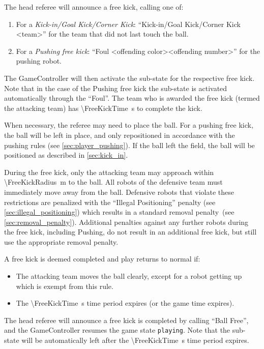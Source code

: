 The head referee will announce a free kick, calling one of:
\begin{enumerate}
  \item For a \textit{Kick-in/Goal Kick/Corner Kick}: ``Kick-in/Goal Kick/Corner Kick \textless team\textgreater'' for the team that did not last touch the ball.
  \item For a \textit{Pushing free kick}: ``Foul \textless offending color\textgreater \textless offending number\textgreater'' for the pushing robot.
\end{enumerate}

The GameController will then activate the sub-state for the respective free kick.
Note that in the case of the Pushing free kick the sub-state is activated automatically through the ``Foul''.
The team who is awarded the free kick (termed the attacking team) has \qty{\FreeKickTime}{\second} to complete the kick.

When necessary, the referee may need to place the ball.
For a pushing free kick, the ball will be left in place, and only repositioned in accordance with the pushing rules (see \cref{sec:player_pushing}).
If the ball left the field, the ball will be positioned as described in \cref{sec:kick_in}.

During the free kick, only the attacking team may approach within \qty{\FreeKickRadius}{\metre} to the ball.
All robots of the defensive team must immediately move away from the ball.
Defensive robots that violate these restrictions are penalized with the ``Illegal Positioning'' penalty (see \cref{sec:illegal_positioning}) which results in a standard removal penalty~(see \cref{sec:removal_penalty}).
Additional penalties against any further robots during the free kick, including Pushing, do not result in an additional free kick, but still use the appropriate removal penalty.

A free kick is deemed completed and play returns to normal if:
\begin{itemize}
  \item The attacking team moves the ball clearly, except for a robot getting up which is exempt from this rule.
  \item The \qty{\FreeKickTime}{\second} time period expires (or the game time expires).
\end{itemize}
The head referee will announce a free kick is completed by calling ``Ball Free'', and the GameController resumes the game state \texttt{playing}.
Note that the sub-state will be automatically left after the \qty{\FreeKickTime}{\second} time period expires.

